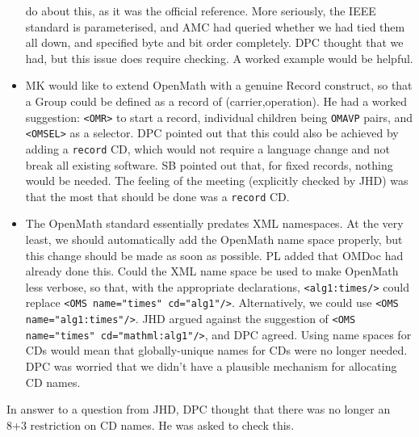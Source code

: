 \documentclass[11pt, a4paper]{article}
\begin{document}
\begin{itemize}
do about this, as it was the official reference. More seriously, the IEEE
standard is parameterised, and AMC had queried whether we had tied them all
down, and specified byte and bit order completely. DPC thought that we had,
but this issue does require checking. A worked example would be helpful.
\item MK would like to extend OpenMath with a genuine Record construct, so
that a Group could be defined as a record of (carrier,operation). He had a
worked suggestion: \verb+<OMR>+ to start a record, individual children
being \verb+OMAVP+ pairs, and \verb+<OMSEL>+ as a selector. DPC pointed out
that this could also be achieved by adding a \verb+record+ CD, which would
not require a language change and not break all existing software. SB
pointed out that, for fixed records, nothing would be needed. The feeling
of the meeting (explicitly checked by JHD) was that the most that should be
done was a \verb+record+ CD.
\item The OpenMath standard essentially predates XML namespaces.
At the very least, we should automatically add
the OpenMath name space properly, but this change should be made as soon as
possible. PL added that OMDoc had already done this.
Could the XML name space be used to make OpenMath less verbose, so that, with
the appropriate declarations, \verb+<alg1:times/>+ could replace
\verb+<OMS name="times" cd="alg1"/>+. Alternatively, we could use
\verb+<OMS name="alg1:times"/>+. JHD argued against the suggestion of
\verb+<OMS name="times" cd="mathml:alg1"/>+, and DPC agreed. Using name
spaces for CDs would mean that globally-unique names for CDs were no longer
needed.  DPC was worried that we didn't have a plausible mechanism for
allocating CD names.
\end{itemize}
In answer to a question from JHD, DPC thought that there was no longer an
8+3 restriction on CD names. He was asked to check this.
\end{document}

